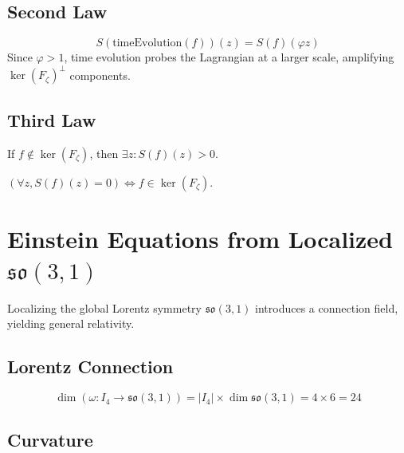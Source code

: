 \subsection{Second Law}

\begin{theorem}
\label{thm:mat_second_law}
\leanok
\[
S(\mathrm{timeEvolution}(f))(z) = S(f)(\varphi z)
\]
Since $\varphi > 1$, time evolution probes the Lagrangian at a larger scale, amplifying $\ker(F_\zeta)^\perp$ components.
\end{theorem}

\subsection{Third Law}

\begin{theorem}
\label{thm:mat_third_law}
\leanok
If $f \notin \ker(F_\zeta)$, then $\exists z: S(f)(z) > 0$.
\end{theorem}

\begin{theorem}
\label{thm:mat_entropy_zero}
\leanok
$(\forall z, S(f)(z) = 0) \iff f \in \ker(F_\zeta)$.
\end{theorem}

\section{Einstein Equations from Localized \texorpdfstring{$\mathfrak{so}(3,1)$}{so(3,1)}}
\label{sec:mat_einstein}

Localizing the global Lorentz symmetry $\mathfrak{so}(3,1)$ introduces a connection field, yielding general relativity.

\subsection{Lorentz Connection}

\begin{theorem}
\label{thm:mat_connection_dim}
\leanok
\[
\dim(\omega : I_4 \to \mathfrak{so}(3,1)) = |I_4| \times \dim \mathfrak{so}(3,1) = 4 \times 6 = 24
\]
\end{theorem}

\subsection{Curvature}

